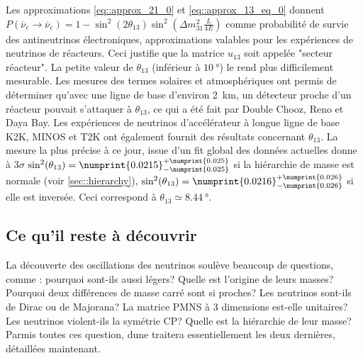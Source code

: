 		    Les approximations \eqref{eq::approx_21_0} et \eqref{eq::approx_13_eq_0} donnent $P(\overline{\nu}_e\to\overline{\nu}_e) = 1-\sin^2(2\theta_{13})\sin^2\left(\Delta m^2_{31}\frac{L}{4E}\right)$ comme probabilité de survie des antineutrinos électroniques, approximations valables pour les expériences de neutrinos de réacteurs. Ceci justifie que la matrice $u_{13}$ soit appelée "secteur réacteur". La petite valeur de $\theta_{13}$ (inférieur à $\SI{10}{\degree}$) le rend plus difficilement mesurable. Les mesures des termes solaires et atmosphériques ont permis de déterminer qu'avec une ligne de base d'environ \SI{2}{\kilo\meter}, un détecteur proche d'un réacteur pouvait s'attaquer à $\theta_{13}$, ce qui a été fait par Double Chooz\cite{Crespo-Anadon2014}, Reno\cite{Collaboration2010} et Daya Bay\cite{An2014}. Les expériences de neutrinos d'accélérateur à longue ligne de base K2K\cite{Collaboration2006a}, MINOS\cite{Collaboration2014} et T2K\cite{Abe2018} ont également fournit des résultats concernant $\theta_{13}$. La mesure la plus précise à ce jour, issue d'un fit global des données actuelles donne à $3\sigma$ $\sin^2(\theta_{13})=\numprint{0.0215}^{+\numprint{0.025}}_{-\numprint{0.025}}$\cite{pdg2018} si la hiérarchie de masse est normale (voir \autoref{sec::hierarchy}), $\sin^2(\theta_{13})=\numprint{0.0216}^{+\numprint{0.026}}_{-\numprint{0.026}}$ si elle est inversée. Ceci correspond à $\theta_{13}\simeq\SI{8.44}{\degree}$.
		    
		    \subsection{Ce qu'il reste à découvrir}
		    
			    La découverte des oscillations des neutrinos soulève beaucoup de questions, comme : pourquoi sont-ils aussi légers? Quelle est l'origine de leurs masses? Pourquoi deux différences de masse carré sont si proches? Les neutrinos sont-ils de Dirac ou de Majorana? La matrice PMNS à 3 dimensions est-elle unitaires? Les neutrinos violent-ils la symétrie CP? Quelle est la hiérarchie de leur masse? Parmis toutes ces question, \gls{dune} traitera essentiellement les deux dernières, détaillées maintenant.
		    

